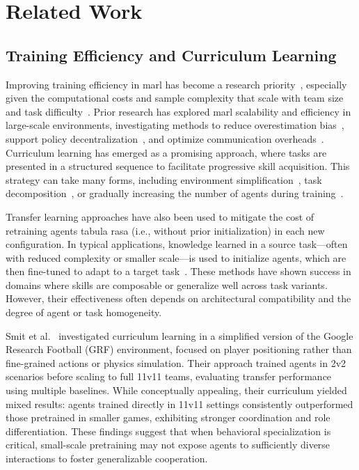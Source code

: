 \documentclass{article}
\begin{document}
\section{Related Work}
\subsection{Training Efficiency and Curriculum Learning}

Improving training efficiency in \gls{marl} has become a research 
priority~\cite{canese2021,krouka2022}, especially given the computational costs and sample 
complexity that scale with team size and task difficulty~\cite{shoham2007,busoniu2008}. 
Prior research has explored \gls{marl} scalability and efficiency in large-scale environments, 
investigating methods to reduce overestimation bias~\cite{ackermann2019}, 
support policy decentralization~\cite{foerster2018,lowe2020}, 
and optimize communication overheads~\cite{sukhbaatar2016,wei2022}. 
Curriculum learning has emerged as a promising approach, where tasks are 
presented in a structured sequence to facilitate progressive skill acquisition. 
This strategy can take many forms, including environment simplification~\cite{shukla2022}, 
task decomposition~\cite{shi2023}, or gradually increasing the number of agents 
during training~\cite{smit2023, albrecht2024}.

Transfer learning approaches have also been used to mitigate the cost of retraining agents 
tabula rasa (i.e., without prior initialization) in each new configuration. 
In typical applications, knowledge learned in a source task—often with reduced 
complexity or smaller scale—is used to initialize agents, 
which are then fine-tuned to adapt to a target task~\cite{cui2022}. 
These methods have shown success in domains where skills are composable 
or generalize well across task variants. However, their effectiveness often 
depends on architectural compatibility and the degree of agent or task homogeneity.

Smit et al.~\cite{smit2023} investigated curriculum learning in a simplified version of the 
Google Research Football (GRF) environment, focused on player positioning rather than 
fine-grained actions or physics simulation. Their approach trained agents in 2v2 scenarios 
before scaling to full 11v11 teams, evaluating transfer performance using multiple baselines. 
While conceptually appealing, their curriculum yielded mixed results: agents trained directly 
in 11v11 settings consistently outperformed those pretrained in smaller games, exhibiting 
stronger coordination and role differentiation. These findings suggest that when behavioral 
specialization is critical, small-scale pretraining may not expose agents to sufficiently 
diverse interactions to foster generalizable cooperation.
\end{document}
